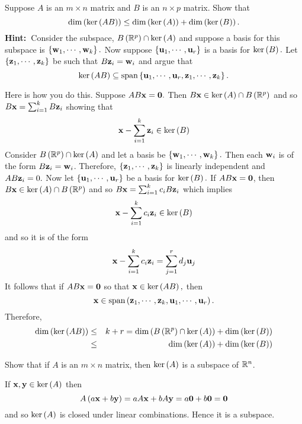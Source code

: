 \begin{enumialphparenastyle}
\begin{ex} Suppose $A$ is an $m\times n$ matrix and $B$ is an $n\times p$ matrix.
Show that 
\begin{equation*}
\dim \left(\ker \left(AB\right) \right) \leq \dim \left(\ker \left(
A\right) \right) +\dim \left(\ker \left(B\right) \right) .
\end{equation*}
\textbf{Hint:\ }Consider the subspace, $B\left(\mathbb{R}^{p}\right) \cap
\ker \left(A\right) $ and suppose a basis for this subspace is $\left\{
{\bf w}_{1},\cdots ,{\bf w}_{k}\right\} .$ Now suppose $\left\{
{\bf u}_{1},\cdots ,{\bf u}_{r}\right\} $ is a basis for $\ker \left(
B\right) .$ Let $\left\{{\bf z}_{1},\cdots ,{\bf z}_{k}\right\} $ be
such that $B{\bf z}_{i}={\bf w}_{i}$ and argue that 
\begin{equation*}
\ker \left(AB\right) \subseteq \mbox{span}\left\{{\bf u}_{1},\cdots ,
{\bf u}_{r},{\bf z}_{1},\cdots ,{\bf z}_{k}\right\} .
\end{equation*}
\vspace{1mm}
\begin{sol}
Here is how you do this. Suppose $AB{\bf x}={\bf 0}.$ Then $B{\bf x}\in \ker
\left(A\right) \cap B\left(\mathbb{R}^{p}\right) $ and so $B{\bf x}
=\sum_{i=1}^{k}B{\bf z}_{i}$ showing that
\[
{\bf x}-\sum_{i=1}^{k}{\bf z}_{i}\in \ker \left(B\right) 
\]
Consider $B\left(\mathbb{R}^{p}\right) \cap \ker \left(A\right) $ and let
a basis be $\left\{{\bf w}_{1},\cdots ,{\bf w}_{k}\right\} .$ Then
each ${\bf w}_{i}$ is of the form $B{\bf z}_{i}={\bf w}_{i}$.
Therefore, $\left\{{\bf z}_{1},\cdots ,{\bf z}_{k}\right\} $ is
linearly independent and $AB{\bf z}_{i}=0.$ Now let $\left\{{\bf u}
_{1},\cdots ,{\bf u}_{r}\right\} $ be a basis for $\ker \left(B\right) .$
If $AB{\bf x}={\bf 0}$, then $B{\bf x} \in \ker \left(A\right) \cap B\left(
\mathbb{R}^{p}\right) $ and so $B{\bf x}=\sum_{i=1}^{k}c_{i}B{\bf z}
_{i}$ which implies
\[
{\bf x}-\sum_{i=1}^{k}c_{i}{\bf z}_{i}\in \ker \left(B\right)
\]
and so it is of the form
\[
{\bf x}-\sum_{i=1}^{k}c_{i}{\bf z}_{i}=\sum_{j=1}^{r}d_{j}{\bf u}
_{j}
\]
It follows that if $AB{\bf x}={\bf 0}$ so that ${\bf x}\in \ker \left(
AB\right) ,$ then
\[
{\bf x}\in \mbox{span}\left({\bf z}_{1},\cdots ,{\bf z}_{k},
{\bf u}_{1},\cdots ,{\bf u}_{r}\right) .
\]
Therefore,
\begin{eqnarray*}
\dim \left(\ker \left(AB\right) \right)  &\leq &k+r=\dim \left(B\left(
\mathbb{R}^{p}\right) \cap \ker \left(A\right) \right) +\dim \left(\ker
\left(B\right) \right)  \\
&\leq &\dim \left(\ker \left(A\right) \right) +\dim \left(\ker \left(
B\right) \right)
\end{eqnarray*}
\end{sol}
\end{ex}


\begin{ex} Show that if $A$ is an $m\times n$ matrix, then $\ker \left(A\right) $
is a subspace of $\mathbb{R}^n$.
\begin{sol}
If ${\bf x},{\bf y}\in \ker \left(A\right) $ then
\[
A\left(a{\bf x}+b{\bf y}\right) =aA{\bf x}+bA{\bf y}=a{\bf 0}
+b{\bf 0}={\bf 0}
\]
and so $\ker \left(A\right) $ is closed under linear combinations. Hence it
is a subspace.
\end{sol}
\end{ex}

\end{enumialphparenastyle}